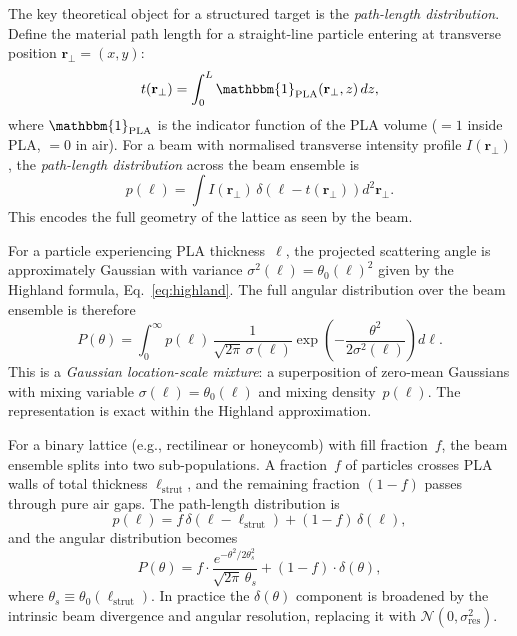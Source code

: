 \documentclass[final,5p,times,twocolumn]{elsarticle}
\begin{document}
The key theoretical object for a structured target is the \emph{path-length distribution}.  Define the material path length for a straight-line particle entering at transverse position $\mathbf{r}_\perp = (x,y)$:
\begin{equation}
  t(\mathbf{r}_\perp) = \int_0^L \mathbbm{1}_{\mathrm{PLA}}(\mathbf{r}_\perp,z)\,dz,
  \label{eq:pathlength}
\end{equation}
where $\mathbbm{1}_{\mathrm{PLA}}$ is the indicator function of the PLA volume ($= 1$ inside PLA, $= 0$ in air).  For a beam with normalised transverse intensity profile $I(\mathbf{r}_\perp)$, the \emph{path-length distribution} across the beam ensemble is
\begin{equation}
  p(\ell) = \int I(\mathbf{r}_\perp)\,\delta\!\left(\ell - t(\mathbf{r}_\perp)\right) d^2\mathbf{r}_\perp.
  \label{eq:pell}
\end{equation}
This encodes the full geometry of the lattice as seen by the beam.

For a particle experiencing PLA thickness~$\ell$, the projected scattering angle is approximately Gaussian with variance $\sigma^2(\ell) = \theta_0(\ell)^2$ given by the Highland formula, Eq.~\eqref{eq:highland}.  The full angular distribution over the beam ensemble is therefore
\begin{equation}
  P(\theta) = \int_0^\infty p(\ell)\,\frac{1}{\sqrt{2\pi}\,\sigma(\ell)}\exp\!\left(-\frac{\theta^2}{2\sigma^2(\ell)}\right) d\ell.
  \label{eq:mixture}
\end{equation}
This is a \emph{Gaussian location-scale mixture}: a superposition of zero-mean Gaussians with mixing variable $\sigma(\ell)=\theta_0(\ell)$ and mixing density~$p(\ell)$.  The representation is exact within the Highland approximation.

For a binary lattice (e.g., rectilinear or honeycomb) with fill fraction~$f$, the beam ensemble splits into two sub-populations.  A fraction~$f$ of particles crosses PLA walls of total thickness $\ell_{\mathrm{strut}}$, and the remaining fraction $(1-f)$ passes through pure air gaps.  The path-length distribution is
\begin{equation}
  p(\ell) = f\,\delta(\ell - \ell_{\mathrm{strut}}) + (1-f)\,\delta(\ell),
  \label{eq:binary_pell}
\end{equation}
and the angular distribution becomes
\begin{equation}
  P(\theta) = f\cdot\frac{e^{-\theta^2/2\theta_s^2}}{\sqrt{2\pi}\,\theta_s} + (1-f)\cdot\delta(\theta),
  \label{eq:binary_P}
\end{equation}
where $\theta_s \equiv \theta_0(\ell_{\mathrm{strut}})$.  In practice the $\delta(\theta)$ component is broadened by the intrinsic beam divergence and angular resolution, replacing it with $\mathcal{N}(0,\sigma_{\mathrm{res}}^2)$.
\end{document}
